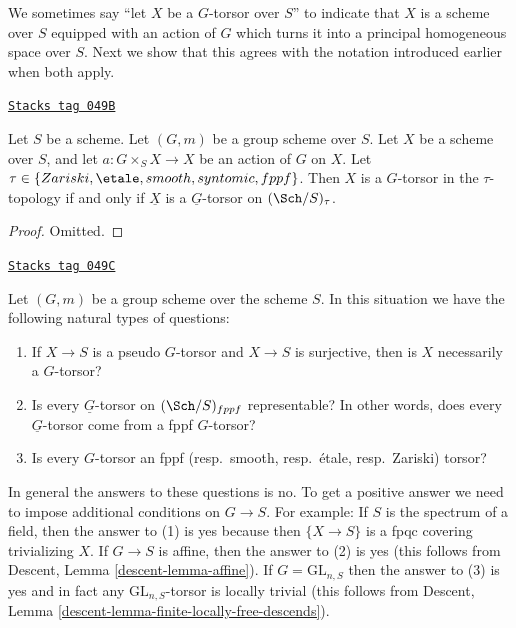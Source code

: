 We sometimes say ``let $X$ be a $G$-torsor over $S$'' to indicate that
$X$ is a scheme over $S$ equipped with an action of $G$ which turns it
into a principal homogeneous space over $S$.
Next we show that this agrees with the notation introduced earlier
when both apply.

\begin{lemma}[Torsor]
\label{groupoids-lemma-torsor}
\href{https://stacks.math.columbia.edu/tag/049B}{\texttt{Stacks tag 049B}}

Let $S$ be a scheme.
Let $(G, m)$ be a group scheme over $S$.
Let $X$ be a scheme over $S$, and let
$a : G \times_S X \to X$ be an action of $G$ on $X$.
Let $\tau \in \{Zariski, \etale, smooth, syntomic, fppf\}$.
Then $X$ is a $G$-torsor in the $\tau$-topology if and only if
$\underline{X}$ is a $\underline{G}$-torsor on $(\Sch/S)_\tau$.
\end{lemma}

\begin{proof}
Omitted.
\end{proof}

\begin{remark}
\label{groupoids-remark-fun-with-torsors}
\href{https://stacks.math.columbia.edu/tag/049C}{\texttt{Stacks tag 049C}}

Let $(G, m)$ be a group scheme over the scheme $S$.
In this situation we have the following natural types of questions:
\begin{enumerate}
\item If $X \to S$ is a pseudo $G$-torsor and $X \to S$ is surjective,
then is $X$ necessarily a $G$-torsor?
\item Is every $\underline{G}$-torsor on $(\Sch/S)_{fppf}$
representable? In other words, does every $\underline{G}$-torsor
come from a fppf $G$-torsor?
\item Is every $G$-torsor an
fppf (resp.\ smooth, resp.\ \'etale, resp.\ Zariski) torsor?
\end{enumerate}
In general the answers to these questions is no. To get a positive answer
we need to impose additional conditions on $G \to S$.
For example:
If $S$ is the spectrum of a field, then the answer to (1) is yes
because then $\{X \to S\}$ is a fpqc covering trivializing $X$.
If $G \to S$ is affine, then the answer to (2) is yes
(this follows from Descent, Lemma \ref{descent-lemma-affine}).
If $G = \text{GL}_{n, S}$ then the answer to (3) is yes
and in fact any $\text{GL}_{n, S}$-torsor is locally trivial
(this follows from
Descent, Lemma \ref{descent-lemma-finite-locally-free-descends}).
\end{remark}

